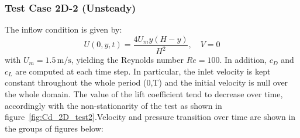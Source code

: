 \documentclass{article}
\begin{document}
\subsubsection{Test Case 2D-2 (Unsteady)}
    The inflow condition is given by:
    \[
    U(0, y, t) = \frac{4U_m y (H - y)}{H^2}, \quad V = 0
    \]
    with \(U_m = 1.5 \, \text{m/s}\), yielding the Reynolds number \(Re = 100\). 
In addition, \(c_D\) and \(c_L\) are computed at each time step. In particular, the inlet velocity is kept constant throughout the whole period (0,T) and the initial velocity is null over the whole domain. The value of the lift coefficient tend to decrease over time, accordingly with the non-stationarity of the test as shown in figure~\ref{fig:Cd_2D_test2}.Velocity and pressure transition over time are shown in the groups of figures below:
\begin{figure}[H]
    \centering
    \hfill
    \label{fig:Cd_Cl_2D_test2}
\end{figure}
\end{document}
